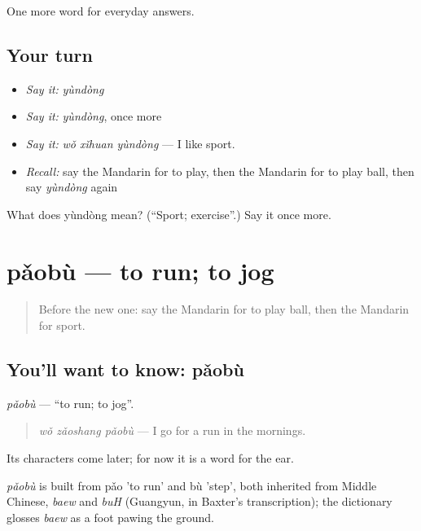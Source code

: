 \begin{grammarlens}[title={What you've built}]
One more word for everyday answers.
\end{grammarlens}

\subsection*{Your turn}
\begin{itemize}
\raggedright
  \item \emph{Say it:} \emph{yùndòng}
  \item \emph{Say it:} \emph{yùndòng}, once more
  \item \emph{Say it:} \emph{wǒ xǐhuan yùndòng} — I like sport.
  \item \emph{Recall:} say the Mandarin for to play, then the Mandarin for to play ball, then say \emph{yùndòng} again
\end{itemize}

\begin{tcolorbox}[breakable,colback=teal!4,colframe=teal!35!black,title={Before you move on}]
What does yùndòng mean? (\textquotedblleft{}Sport; exercise\textquotedblright{}.) Say it once more.
\end{tcolorbox}
\section[pǎobù]{pǎobù — to run; to jog}

\label{lesson:ZH-C56-paobu}



\begin{quote}
Before the new one: say the Mandarin for to play ball, then the Mandarin for sport.
\end{quote}

\subsection*{You'll want to know: pǎobù}
\emph{pǎobù} — \textquotedblleft{}to run; to jog\textquotedblright{}.

\begin{quote}
\emph{wǒ zǎoshang pǎobù} — I go for a run in the mornings.
\end{quote}

Its characters come later; for now it is a word for the ear.

\begin{cousinweb}
\emph{pǎobù} is built from pǎo 'to run' and bù 'step', both inherited from Middle Chinese, \emph{baew} and \emph{buH} (Guangyun, in Baxter's transcription); the dictionary glosses \emph{baew} as a foot pawing the ground.
\end{cousinweb}


